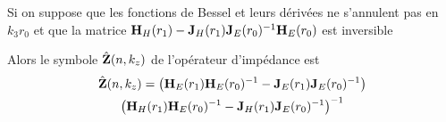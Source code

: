         \begin{thm}
            Si on suppose que les fonctions de Bessel et leurs dérivées ne s’annulent pas en \(k_3r_0\) et que 
            la matrice \(\mathbf{H}_{H}(r_1) - \mathbf{J}_{H}(r_1)\mathbf{J}_{E}(r_0)^{-1}\mathbf{H}_{E}(r_0)\) est inversible

            Alors le symbole \(\hat {\mathbf{Z}}(n,k_z)\) de l'opérateur d'impédance est
            \begin{multline}
                \hat {\mathbf{Z}}(n,k_z) = 
                \left(\mathbf{H}_{E}(r_1)\mathbf{H}_{E}(r_0)^{-1} - \mathbf{J}_{E}(r_1)\mathbf{J}_{E}(r_0)^{-1}\right)\\
                \left(\mathbf{H}_{H}(r_1)\mathbf{H}_{E}(r_0)^{-1} - \mathbf{J}_{H}(r_1)\mathbf{J}_{E}(r_0)^{-1}\right)^{-1}
            \end{multline}
        \end{thm}

